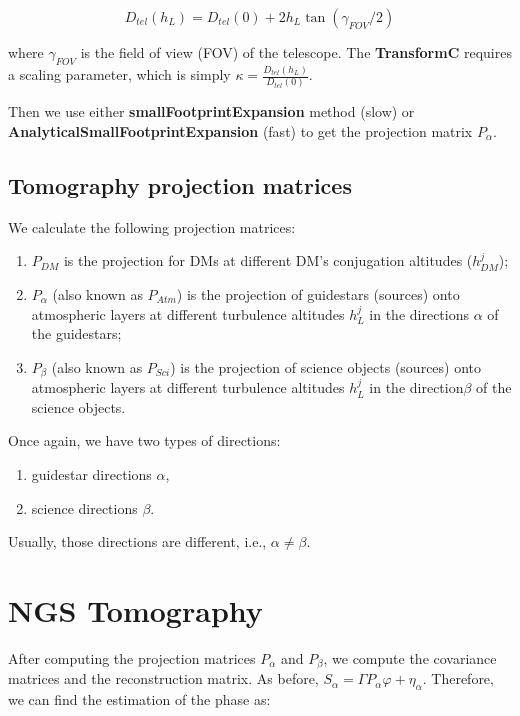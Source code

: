 \documentclass[a4paper,12pt]{article}
\begin{document}
$$D_{tel}(h_L) = D_{tel}(0) + 2 h_L \tan(\gamma_{FOV} /2)$$

where $\gamma_{FOV}$ is the field of view (FOV) of the telescope. The \textbf{TransformC} requires a scaling parameter, which is simply $\kappa = \frac{ D_{tel}(h_L)  }{   D_{tel}(0)  }$. 

Then we use either \textbf{smallFootprintExpansion} method (slow) or \textbf{AnalyticalSmallFootprintExpansion} (fast) to get the projection matrix $P_\alpha$.


\subsection{Tomography projection matrices}
We calculate the following projection matrices:
\begin{enumerate}
 \item $P_{DM}$ is the projection for DMs at different DM's conjugation altitudes ($h^j_{DM}$);

 \item $P_{\alpha}$ (also known as $P_{Atm}$)  is the projection of guidestars (sources) onto atmospheric layers at different turbulence altitudes $h^j_{L}$ in the directions $\alpha$ of the guidestars;

 \item $P_{\beta}$ (also known as $P_{Sci}$) is the projection of science objects (sources) onto atmospheric layers at different turbulence altitudes $h^j_{L}$ in the direction$\beta$ of the science objects.
\end{enumerate}

Once again, we have two types of directions:

\begin{enumerate}
 \item guidestar directions $\alpha$,
 \item science directions $\beta$.
\end{enumerate}

Usually, those directions are different, i.e.,  $\alpha \neq  \beta$.





\section{NGS Tomography}
After computing the projection matrices  $P_{\alpha}$ and $P_{\beta}$, we compute the covariance matrices and the reconstruction matrix. As before, $S_\alpha = \Gamma P_\alpha \varphi  + \eta_\alpha $. Therefore, we can find the estimation of the phase as:
\end{document}

